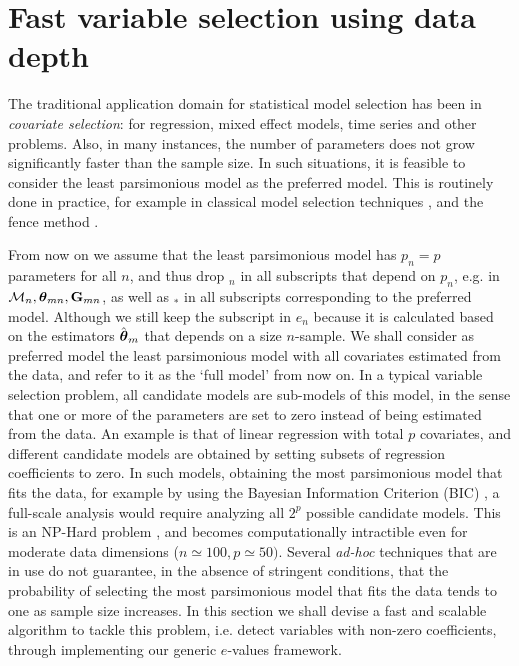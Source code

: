 \section{Fast variable selection using data depth}
\label{Section:FastMS}

The traditional application domain for statistical model selection has been in \textit{covariate selection}: for regression, mixed effect models, time series and other problems. Also, in many instances, the number of parameters does not grow significantly faster than the sample size. In such situations, it is feasible to consider the least parsimonious model as the preferred model. This is routinely done in practice, for example in classical model selection techniques \citep{KonishiKitagawa96, ClaeskensHjort08Book}, and the fence method \citep{JiangEtal08}.

From now on we assume that the least parsimonious model has $p_n = p$ parameters for all $n$, and thus drop ${}_n$ in all subscripts that depend on $p_n$, e.g. in ${\cal{M}}_n, {\boldsymbol{\theta}}_{mn}, {\mathbf{G}}_{mn}$, as well as ${}_*$ in all subscripts corresponding to the preferred model. Although we still keep the subscript in $e_n$ because it is calculated based on the estimators $\hat {{\boldsymbol{\theta}}}_m$ that depends on a size $n$-sample. We shall consider as preferred model the least parsimonious model with all covariates estimated from the data, and refer to it as the `full model' from now on. In a typical variable selection problem, all candidate models are sub-models of this model, in the sense that one or more of the parameters are set to zero instead of being estimated from the data. An example is that of linear regression with total $p$ covariates, and different candidate models are obtained by setting subsets of regression coefficients to zero. In such models, obtaining the most parsimonious model that fits the data, for example by using the Bayesian Information Criterion (BIC) \citep{Schwarz78}, a full-scale analysis would require analyzing all $2^{ p}$ possible candidate models. This is an NP-Hard problem \citep{Natarajan95}, and becomes computationally intractible even for moderate data dimensions ($n \simeq 100, p \simeq 50)$. Several {\textit{ad-hoc}} techniques that are in use do not guarantee, in the absence of stringent conditions,  that the probability of selecting the most parsimonious model that fits the data tends to one as sample size increases. In this section we shall devise a fast and scalable algorithm to tackle this problem, i.e. detect variables with non-zero coefficients, through implementing our generic $e$-values framework.

